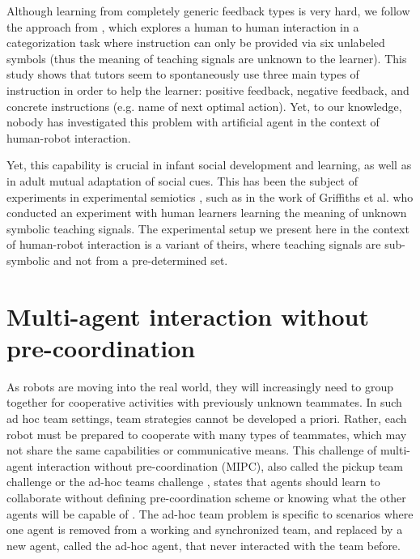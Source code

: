 Although learning from completely generic feedback types is very hard, we follow the approach from \cite{griffiths2012bottom}, which explores a human to human interaction in a categorization task where instruction can only be provided via six unlabeled symbols (thus the meaning of teaching signals are unknown to the learner). This study shows that tutors seem to spontaneously use three main types of instruction in order to help the learner: positive feedback, negative feedback, and concrete instructions (e.g. name of next optimal action). Yet, to our knowledge, nobody has investigated this problem with artificial agent in the context of human-robot interaction.

Yet, this capability is crucial in infant social development and learning, as well as in adult mutual adaptation of social cues. This has been the subject of experiments in experimental semiotics \cite{galantucci2009experimental}, such as in the work of Griffiths et al. \cite{griffiths2012bottom} who conducted an experiment with human learners learning the meaning of unknown symbolic teaching signals. The experimental setup we present here in the context of human-robot interaction is a variant of theirs, where teaching signals are sub-symbolic and not from a pre-determined set.


\section{Multi-agent interaction without pre-coordination}

As robots are moving into the real world, they will increasingly need to group together for cooperative activities with previously unknown teammates. In such ad hoc team settings, team strategies cannot be developed a priori. Rather, each robot must be prepared to cooperate with many types of teammates, which may not share the same capabilities or communicative means. This challenge of multi-agent interaction without pre-coordination (MIPC), also called the pickup team challenge \cite{gil2006dynamically} or the ad-hoc teams challenge \cite{stone2010ad}, states that agents should learn to collaborate without defining pre-coordination scheme or knowing what the other agents will be capable of \cite{bowling2005coordination,gil2006dynamically,stone2010ad}. The ad-hoc team problem \cite{stone2010ad} is specific to scenarios where one agent is removed from a working and synchronized team, and replaced by a new agent, called the ad-hoc agent, that never interacted with the team before.

